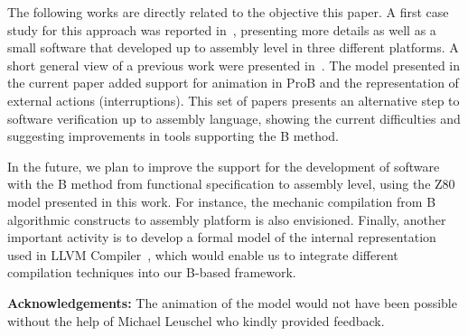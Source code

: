 \documentclass[a4paper]{llncs}
\begin{document}
The following works are directly related to the objective this paper.
A first case study for this approach was reported in~\cite{Dantas_SBMF08}, presenting
more details as well as a small software that developed up to assembly
level in three different platforms. A short general view of a previous work
were presented in~\cite{Valerio_SBMF09}. The model presented in the 
current paper added support for animation in ProB and the representation
of external actions (interruptions).
This set of papers presents an alternative step to software verification
up to assembly language, showing the current difficulties and
suggesting improvements in tools supporting the B method.

In the future, we plan to improve the support for the development of
software with the B method from functional specification to assembly
level, using the Z80 model presented in this work. For instance, the
mechanic compilation from B algorithmic constructs to assembly
platform is also envisioned. Finally, another important activity is to
develop a formal model of the internal representation used in LLVM
Compiler~\cite{DBLP:conf/cgo/LattnerA04}, which would enable us to
integrate different compilation techniques into our B-based framework.


\textbf{Acknowledgements:} The animation of the model would not
have been possible without the help of Michael Leuschel who kindly
provided feedback.%



\end{document}
